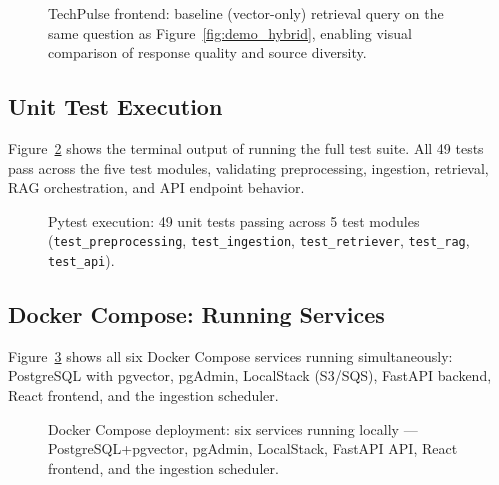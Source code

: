 \documentclass[12pt,a4paper]{report}
\begin{document}
\begin{figure}[H]
\centering
{}
\caption{TechPulse frontend: baseline (vector-only) retrieval query on the same question as Figure~\ref{fig:demo_hybrid}, enabling visual comparison of response quality and source diversity.}
\label{fig:demo_baseline}
\end{figure}

\subsection{Unit Test Execution}

Figure~\ref{fig:demo_tests} shows the terminal output of running the full test suite. All 49 tests pass across the five test modules, validating preprocessing, ingestion, retrieval, RAG orchestration, and API endpoint behavior.

\begin{figure}[H]
\centering
{}
\caption{Pytest execution: 49 unit tests passing across 5 test modules (\texttt{test\_preprocessing}, \texttt{test\_ingestion}, \texttt{test\_retriever}, \texttt{test\_rag}, \texttt{test\_api}).}
\label{fig:demo_tests}
\end{figure}

\subsection{Docker Compose: Running Services}

Figure~\ref{fig:demo_docker} shows all six Docker Compose services running simultaneously: PostgreSQL with pgvector, pgAdmin, LocalStack (S3/SQS), FastAPI backend, React frontend, and the ingestion scheduler.

\begin{figure}[H]
\centering
{}
\caption{Docker Compose deployment: six services running locally --- PostgreSQL+pgvector, pgAdmin, LocalStack, FastAPI API, React frontend, and the ingestion scheduler.}
\label{fig:demo_docker}
\end{figure}
\end{document}
